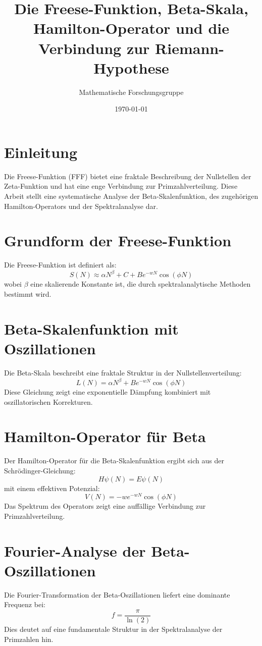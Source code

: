 \documentclass[a4paper,12pt]{article}
\title{Die Freese-Funktion, Beta-Skala, Hamilton-Operator und die Verbindung zur Riemann-Hypothese}
\author{Mathematische Forschungsgruppe}
\date{\today}
\begin{document}
\maketitle

\section{Einleitung}
Die Freese-Funktion (FFF) bietet eine fraktale Beschreibung der Nullstellen der Zeta-Funktion und hat eine enge Verbindung zur Primzahlverteilung. Diese Arbeit stellt eine systematische Analyse der Beta-Skalenfunktion, des zugehörigen Hamilton-Operators und der Spektralanalyse dar.

\section{Grundform der Freese-Funktion}
Die Freese-Funktion ist definiert als:
\begin{equation}
S(N) \approx \alpha N^\beta + C + B e^{-wN} \cos(\phi N)
\end{equation}
wobei $\beta$ eine skalierende Konstante ist, die durch spektralanalytische Methoden bestimmt wird.

\section{Beta-Skalenfunktion mit Oszillationen}
Die Beta-Skala beschreibt eine fraktale Struktur in der Nullstellenverteilung:
\begin{equation}
L(N) = \alpha N^\beta + B e^{-wN} \cos(\phi N)
\end{equation}
Diese Gleichung zeigt eine exponentielle Dämpfung kombiniert mit oszillatorischen Korrekturen.

\section{Hamilton-Operator für Beta}
Der Hamilton-Operator für die Beta-Skalenfunktion ergibt sich aus der Schrödinger-Gleichung:
\begin{equation}
H \psi(N) = E \psi(N)
\end{equation}
mit einem effektiven Potenzial:
\begin{equation}
V(N) = - w e^{-wN} \cos(\phi N)
\end{equation}
Das Spektrum des Operators zeigt eine auffällige Verbindung zur Primzahlverteilung.

\section{Fourier-Analyse der Beta-Oszillationen}
Die Fourier-Transformation der Beta-Oszillationen liefert eine dominante Frequenz bei:
\begin{equation}
f = \frac{\pi}{\ln(2)}
\end{equation}
Dies deutet auf eine fundamentale Struktur in der Spektralanalyse der Primzahlen hin.
\end{document}
